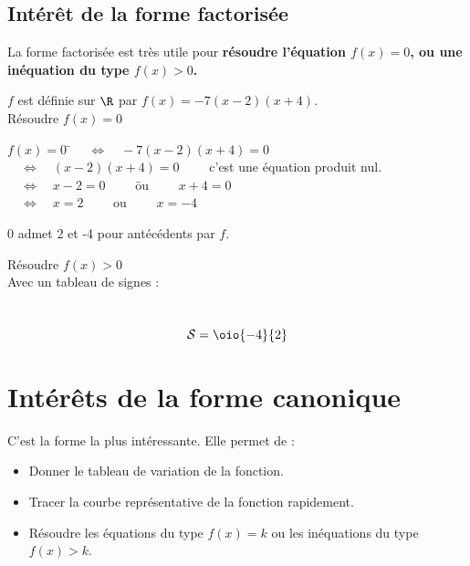 \documentclass[a4paper,11pt,cours]{nsi}
\begin{document}
\subsection{Intérêt de la forme factorisée}
La forme factorisée est très utile pour \textbf{\boldmath résoudre l'équation $f(x)=0$, ou une inéquation du type $f(x)>0$.}

\begin{exemple}[\ 1]
	$f$ est définie sur $\R$ par $f(x)=-7(x-2)(x+4)$.\\
	{\boldmath Résoudre $f(x)=0$}
	\begin{tabbing}
		$f(x)=0$	\= 	$\quad\Leftrightarrow\quad -7(x-2)(x+4)=0$	\\
		\>	$\quad\Leftrightarrow\quad (x-2)(x+4)=0\qquad$ c'est une équation produit nul.\\
		\>	$\quad\Leftrightarrow\quad x-2=0\qquad$ \= 	ou $\qquad x+4=0$	\\
		\>	$\quad\Leftrightarrow\quad x=2\qquad$ \> 	ou $\qquad x=-4$
	\end{tabbing}
	0 admet 2 et -4 pour antécédents par $f$.
\end{exemple}

\begin{exemple}[\ 2]
	{\boldmath Résoudre $f(x)>0$}\\
	Avec un tableau de signes :
	\begin{center}
		\\
		
		$$\mathcal{S}=\oio{-4}{2}$$
	\end{center}
\end{exemple}
\section{Intérêts de la forme canonique}

C'est la forme la plus intéressante. Elle permet de :
\begin{itemize}
	\item 	Donner le tableau de variation de la fonction.
	\item 	Tracer la courbe représentative de la fonction rapidement.
	\item 	Résoudre les équations du type $f(x)=k$  ou les inéquations du type $f(x)>k$.
\end{itemize}
\end{document}
